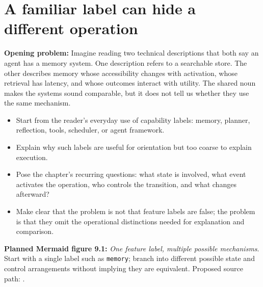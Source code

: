 \section{A familiar label can hide a different operation}
\textbf{Opening problem:} Imagine reading two technical descriptions that both say an agent has a memory system. One description refers to a searchable store. The other describes memory whose accessibility changes with activation, whose retrieval has latency, and whose outcomes interact with utility. The shared noun makes the systems sound comparable, but it does not tell us whether they use the same mechanism.
\begin{itemize}
  \item Start from the reader's everyday use of capability labels: memory, planner, reflection, tools, scheduler, or agent framework.
  \item Explain why such labels are useful for orientation but too coarse to explain execution.
  \item Pose the chapter's recurring questions: what state is involved, what event activates the operation, who controls the transition, and what changes afterward?
  \item Make clear that the problem is not that feature labels are false; the problem is that they omit the operational distinctions needed for explanation and comparison.
\end{itemize}
\textbf{Planned Mermaid figure 9.1:} \emph{One feature label, multiple possible mechanisms}. Start with a single label such as \texttt{memory}; branch into different possible state and control arrangements without implying they are equivalent. Proposed source path: .

